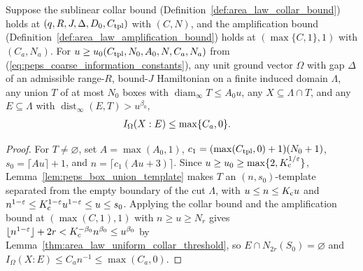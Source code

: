 \begin{lemma}
    \label{thm:peps_coarse_information_of_collar_explicit}
    \leanok
    Suppose the sublinear collar bound (Definition~\ref{def:area_law_collar_bound}) holds at $(q,R,J,\Delta,D_0,C_{\rm tpl})$ with $(C,N)$, and the amplification bound (Definition~\ref{def:area_law_amplification_bound}) holds at $(\max\{C,1\},1)$ with $(C_a,N_a)$. For $u\ge u_0(C_{\rm tpl},N_0,A_0,N,C_a,N_a)$ from (\ref{eq:peps_coarse_information_constants}), any unit ground vector $\Omega$ with gap $\Delta$ of an admissible range-$R$, bound-$J$ Hamiltonian on a finite induced domain $\Lambda$, any union $T$ of at most $N_0$ boxes with $\operatorname{diam}_\infty T\le A_0u$, any $X\subseteq\Lambda\cap T$, and any $E\subseteq\Lambda$ with $\operatorname{dist}_\infty(E,T)>u^{\beta_0}$,
    \begin{align}
        I_\Omega(X:E) & \le \max\{C_a,0\}. \notag
    \end{align}
\end{lemma}
\begin{proof}
    \leanok
    For $T\ne\varnothing$, set $A=\max(A_0,1)$, $c_1=(\max(C_{\rm tpl},0)+1)(N_0+1)$, $s_0=\lceil Au\rceil+1$, and $n=\lceil c_1(Au+3)\rceil$. Since $u\ge u_0\ge\max\{2,K_{\rm c}^{1/\varepsilon}\}$, Lemma~\ref{lem:peps_box_union_template} makes $T$ an $(n,s_0)$-template separated from the empty boundary of the cut $\Lambda$, with $u\le n\le K_{\rm c}u$ and $n^{1-\varepsilon}\le K_{\rm c}^{1-\varepsilon}u^{1-\varepsilon}\le u\le s_0$. Applying the collar bound and the amplification bound at $(\max(C,1),1)$ with $n\ge u\ge N_r$ gives $\lfloor n^{1-\varepsilon}\rfloor+2r<K_{\rm c}^{-\beta_0}n^{\beta_0}\le u^{\beta_0}$ by Lemma~\ref{thm:area_law_uniform_collar_threshold}, so $E\cap N_{2r}(S_0)=\varnothing$ and $I_\Omega(X:E)\le C_an^{-1}\le\max(C_a,0)$.
\end{proof}

